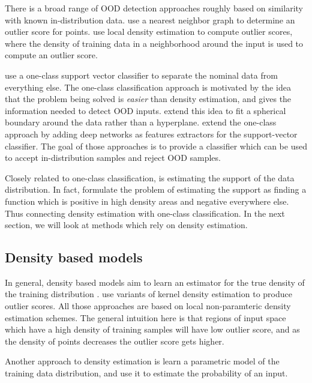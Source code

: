 \documentclass[../main.tex]{subfiles}
\begin{document}
There is a broad range of OOD detection approaches roughly based on similarity with known in-distribution data. \citep{hautamaki2004outlier, NIPS2009_3723, zhang2009new} use a nearest neighbor graph to determine an outlier score for points. \citep{breunig2000lof} use local density estimation to compute outlier scores, where the density of training data in a neighborhood around the input is used to compute an outlier score. 

\cite{scholkopf2000support} use a one-class support vector classifier to separate the nominal data from everything else. The one-class classification approach is motivated by the idea that the problem being solved is \emph{easier} than density estimation, and gives the information needed to detect OOD inputs.  
\citet{tax2004support} extend this idea to fit a spherical boundary around the data rather than a hyperplane. \citet{erfani2016high, ruff2018deep} extend the one-class approach by adding deep networks as features extractors for the support-vector classifier. The goal of those approaches is to provide a classifier which can be used to accept in-distribution samples and reject OOD samples. 

Closely related to one-class classification, is estimating the support of the data distribution. In fact, \citet{platt1999estimating} formulate the problem of estimating the support as finding a function which is positive in high density areas and negative everywhere else. Thus connecting density estimation with one-class classification. In the next section, we will look at methods which rely on density estimation. 

\subsection{Density based models}

In general, density based models aim to learn an estimator for the true density of the training distribution . \citep{qin2016kelos, he2004novelty, bishop1994novelty} use variants of kernel density estimation to produce outlier scores. All those approaches are based on local non-paramteric density estimation schemes. The general intuition here is that regions of input space which have a high density of training samples will have low outlier score, and as the density of points decreases the outlier score gets higher. 

Another approach to density estimation is learn a parametric model of the training data distribution, and use it to estimate the probability of an input. 
\end{document}

